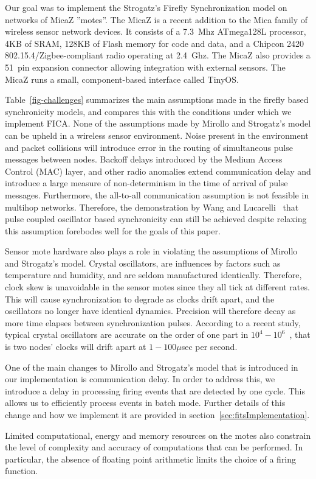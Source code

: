 Our goal was to implement the Strogatz's Firefly Synchronization model on
networks of MicaZ ''motes''.  The MicaZ is a recent addition to the Mica
family of wireless sensor network devices.  It consists of a 7.3~Mhz
ATmega128L processor, 4KB of SRAM, 128KB of Flash memory for code and data,
and a Chipcon 2420 802.15.4/Zigbee-compliant radio operating at 2.4~Ghz.  The
MicaZ also provides a 51~pin expansion connector allowing integration with
external sensors. The MicaZ runs a small, component-based interface called
TinyOS.  

Table~\ref{fig-challenges} summarizes the main assumptions made in 
the firefly based synchronicity models, and compares this with the conditions
under which we implement FICA.
None of the assumptions made by Mirollo and Strogatz's model can be
upheld in a wireless sensor environment. Noise present in the environment
and packet collisions will introduce error in the routing of simultaneous pulse messages 
between nodes.  Backoff delays introduced by the Medium Access Control (MAC) layer, 
and other radio anomalies extend communication delay and introduce a 
large measure of non-determinism in the time of arrival of pulse messages. 
Furthermore, the all-to-all communication assumption is not feasible 
in multihop networks. Therefore, the demonstration by Wang and Lucarelli~\cite{lw04}
that pulse coupled oscillator based synchronicity can still be achieved 
despite relaxing this assumption forebodes well for the goals of this paper.

Sensor mote hardware also plays a role in violating the assumptions of Mirollo and Strogatz's model. 
Crystal oscillators, are influences by factors such as temperature and humidity, 
and are seldom manufactured identically. Therefore, clock skew is unavoidable in 
the sensor motes since they all tick at different rates. 
This will cause synchronization to degrade as clocks drift apart, and the oscillators
no longer have identical dynamics. Precision will therefore decay as more time elapses between 
synchronization pulses. According to a recent study, typical crystal oscillators
are accurate on the order of one part in $10^4-10^6$~\cite{vig92}, that is two nodes' clocks
will drift apart at $1-100\mu$sec per second.

One of the main changes to Mirollo and Strogatz's model that is introduced
in our implementation is communication delay. In order to address this, we introduce
a delay in processing firing events that are detected by one cycle. This allows
us to efficiently process events in batch mode. Further details of this change
and how we implement it are provided in section~\ref{sec:fitsImplementation}.

Limited computational, energy and memory resources on the motes also constrain
the level of complexity and accuracy of computations that can be performed.
In particular, the absence of floating point arithmetic limits the choice
of a firing function.






